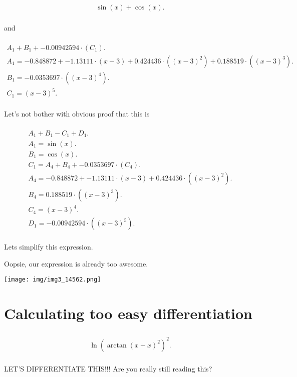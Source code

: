 \documentclass[12pt,a4paper]{extreport}
\begin{document}
\begin{multline}
\\
\sin(x) + \cos(x).\\
\end{multline}


and


\begin{multline}
\\
A_{1} + B_{1} + -0.00942594 \cdot (C_{1}).\\
A_{1} = -0.848872 + -1.13111 \cdot (x - 3) + 0.424436 \cdot ((x - 3) ^ {2}) + 0.188519 \cdot ((x - 3) ^ {3}).\\
B_{1} = -0.0353697 \cdot ((x - 3) ^ {4}).\\
C_{1} = (x - 3) ^ {5}.\\
\end{multline}

Let's not bother with obvious proof that this is 

\begin{multline}
\\
A_{1} + B_{1} - C_{1} + D_{1}.\\
A_{1} = \sin(x).\\
B_{1} = \cos(x).\\
C_{1} = A_{4} + B_{4} + -0.0353697 \cdot (C_{4}).\\
A_{4} = -0.848872 + -1.13111 \cdot (x - 3) + 0.424436 \cdot ((x - 3) ^ {2}).\\
B_{4} = 0.188519 \cdot ((x - 3) ^ {3}).\\
C_{4} = (x - 3) ^ {4}.\\
D_{1} = -0.00942594 \cdot ((x - 3) ^ {5}).\\
\end{multline}


Lets simplify this expression.

Oopsie, our expression is already too awesome.

\texttt{[image: img/img3\_14562.png]}
\section{Calculating too easy differentiation}


\begin{multline}
\\
\ln(\arctan(x + x) ^ {2}) ^ {2}.\\
\end{multline}


LET'S DIFFERENTIATE THIS!!!
Are you really still reading this? 
\end{document}
